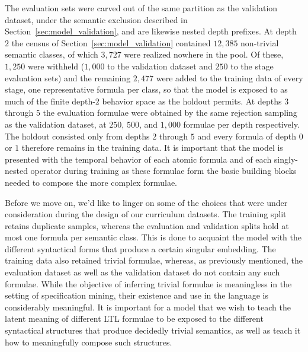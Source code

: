 \documentclass[titlepage,a4paper,11pt]{report}
\begin{document}
    The evaluation sets were carved out of the same partition as the validation dataset, under the semantic exclusion described in Section~\ref{sec:model_validation}, and are likewise nested depth prefixes. At depth $2$ the census of Section~\ref{sec:model_validation} contained $12{,}385$ non-trivial semantic classes, of which $3{,}727$ were realized nowhere in the pool. Of these, $1{,}250$ were withheld ($1{,}000$ to the validation dataset and $250$ to the stage evaluation sets) and the remaining $2{,}477$ were added to the training data of every stage, one representative formula per class, so that the model is exposed to as much of the finite depth-$2$ behavior space as the holdout permits. At depths $3$ through $5$ the evaluation formulae were obtained by the same rejection sampling as the validation dataset, at $250$, $500$, and $1{,}000$ formulae per depth respectively. The holdout consisted only from depths $2$ through $5$ and every formula of depth $0$ or $1$ therefore remains in the training data. It is important that the model is presented with the temporal behavior of each atomic formula and of each singly-nested operator during training as these formulae form the basic building blocks needed to compose the more complex formulae.
    
    Before we move on, we'd like to linger on some of the choices that were under consideration during the design of our curriculum datasets. The training split retains duplicate samples, whereas the evaluation and validation splits hold at most one formula per semantic class. This is done to acquaint the model with the different syntactical forms that produce a certain singular embedding. The training data also retained trivial formulae, whereas, as previously mentioned, the evaluation dataset as well as the validation dataset do not contain any such formulae. While the objective of inferring trivial formulae is meaningless in the setting of specification mining, their existence and use in the language is considerably meaningful. It is important for a model that we wish to teach the latent meaning of different LTL formulae to be exposed to the different syntactical structures that produce decidedly trivial semantics, as well as teach it how to meaningfully compose such structures.
    
\end{document}
